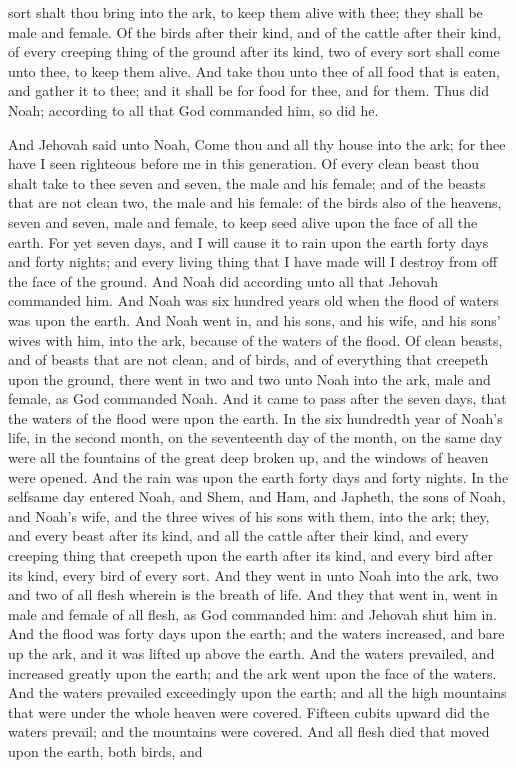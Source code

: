 sort shalt thou bring into the ark, to keep them alive with thee; they shall be male and female. Of the birds after their kind, and of the cattle after their kind, of every creeping thing of the ground after its kind, two of every sort shall come unto thee, to keep them alive. And take thou unto thee of all food that is eaten, and gather it to thee; and it shall be for food for thee, and for them. Thus did Noah; according to all that God commanded him, so did he. 

And Jehovah said unto Noah, Come thou and all thy house into the ark; for thee have I seen righteous before me in this generation. Of every clean beast thou shalt take to thee seven and seven, the male and his female; and of the beasts that are not clean two, the male and his female: of the birds also of the heavens, seven and seven, male and female, to keep seed alive upon the face of all the earth. For yet seven days, and I will cause it to rain upon the earth forty days and forty nights; and every living thing that I have made will I destroy from off the face of the ground. And Noah did according unto all that Jehovah commanded him.  And Noah was six hundred years old when the flood of waters was upon the earth. And Noah went in, and his sons, and his wife, and his sons’ wives with him, into the ark, because of the waters of the flood. Of clean beasts, and of beasts that are not clean, and of birds, and of everything that creepeth upon the ground, there went in two and two unto Noah into the ark, male and female, as God commanded Noah. And it came to pass after the seven days, that the waters of the flood were upon the earth. In the six hundredth year of Noah’s life, in the second month, on the seventeenth day of the month, on the same day were all the fountains of the great deep broken up, and the windows of heaven were opened. And the rain was upon the earth forty days and forty nights.  In the selfsame day entered Noah, and Shem, and Ham, and Japheth, the sons of Noah, and Noah’s wife, and the three wives of his sons with them, into the ark; they, and every beast after its kind, and all the cattle after their kind, and every creeping thing that creepeth upon the earth after its kind, and every bird after its kind, every bird of every sort. And they went in unto Noah into the ark, two and two of all flesh wherein is the breath of life. And they that went in, went in male and female of all flesh, as God commanded him: and Jehovah shut him in. And the flood was forty days upon the earth; and the waters increased, and bare up the ark, and it was lifted up above the earth. And the waters prevailed, and increased greatly upon the earth; and the ark went upon the face of the waters. And the waters prevailed exceedingly upon the earth; and all the high mountains that were under the whole heaven were covered. Fifteen cubits upward did the waters prevail; and the mountains were covered. And all flesh died that moved upon the earth, both birds, and 
